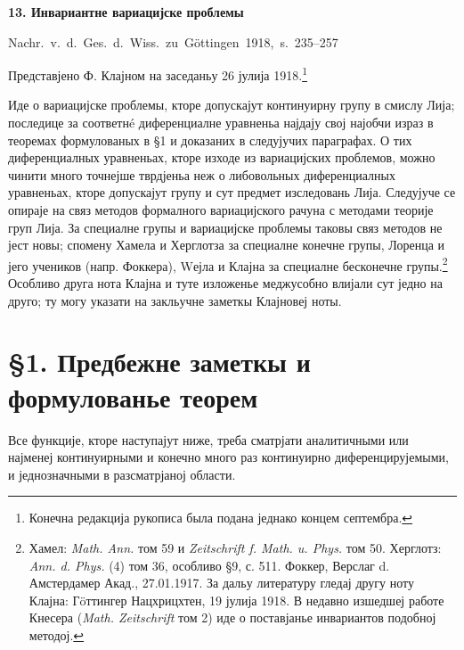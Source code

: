 ﻿\documentclass[11pt]{article}
\begin{document}

\begin{center}
{\Large\bfseries 13. Инвариантне вариацијске проблемы}\par
\vspace{1.5em}
\mbox{Nachr. v. d. Ges. d. Wiss. zu Göttingen 1918, s. 235--257}
\end{center}

\vspace{3em}
\begin{center}
Представјено Ф. Клајном на заседаньу 26 јулија 1918.\footnote{Конечна редакција рукописа была подана једнако концем септембра.}
\end{center}

Иде о вариацијске проблемы, кторе допускајут континуирну групу в смислу Лија; последице за соответнé диференциалне уравненьа најдају свој најобчи израз в теоремах формулованых в \S{}1 и доказаних в следујучих параграфах. О тих диференциалных уравненьах, кторе изходе из вариацијских проблемов, можно чинити много точнејше тврдјеньа неж о либовольных диференциалных уравненьах, кторе допускајут групу и сут предмет изследовань Лија. Следујуче се опираје на связ методов формалного вариацијского рачуна с методами теорије груп Лија. За специалне групы и вариацијске проблемы таковы связ методов не јест новы; спомену Хамела и Херглотза за специалне конечне групы, Лоренца и јего учеников (напр. Фоккера), Wејла и Клајна за специалне бесконечне групы.\footnote{Хамел: \emph{Math. Ann.} том 59 и \emph{Zeitschrift f. Math. u. Phys.} том 50. Херглотз: \emph{Ann. d. Phys.} (4) том 36, особливо \S{}9, с. 511. Фоккер, Верслаг d. Амстердамер Акад., 27.01.1917. За дальу литературу гледај другу ноту Клајна: Гöттингер Нацхрицхтен, 19 јулија 1918. В недавно изшедшеј работе Кнесера (\emph{Math. Zeitschrift} том 2) иде о поставјанье инвариантов подобној методој.} Особливо друга нота Клајна и туте изложенье меджусобно влијали сут једно на друго; ту могу указати на закльучне заметкы Клајновеј ноты.

\section*{\S{}1. Предбежне заметкы и формулованье теорем}

Все функције, кторе наступајут ниже, треба сматрјати аналитичными или најменеј континуирными и конечно много раз континуирно диференцирујемыми, и једнозначными в разсматрјаној области.
\end{document}
